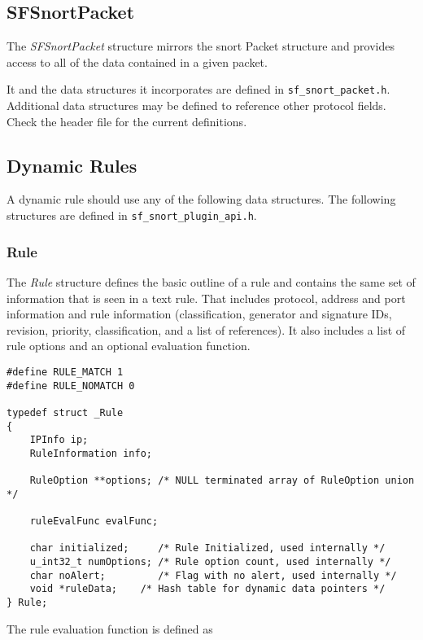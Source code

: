\documentclass[english]{report}
\begin{document}
\subsection{SFSnortPacket}

The {\em SFSnortPacket} structure mirrors the snort Packet structure and
provides access to all of the data contained in a given packet.

It and the data structures it incorporates are defined in
\texttt{sf\_snort\_packet.h}.  Additional data structures may be defined to
reference other protocol fields.  Check the header file for the current
definitions.

\subsection{Dynamic Rules}

A dynamic rule should use any of the following data structures.  The following
structures are defined in \texttt{sf\_snort\_plugin\_api.h}.

\subsubsection{Rule}

The {\em Rule} structure defines the basic outline of a rule and contains the
same set of information that is seen in a text rule.  That includes protocol,
address and port information and rule information (classification, generator
and signature IDs, revision, priority, classification, and a list of
references).  It also includes a list of rule options and an optional
evaluation function.

\begin{verbatim}
#define RULE_MATCH 1
#define RULE_NOMATCH 0

typedef struct _Rule
{
    IPInfo ip;
    RuleInformation info;

    RuleOption **options; /* NULL terminated array of RuleOption union */

    ruleEvalFunc evalFunc;

    char initialized;     /* Rule Initialized, used internally */
    u_int32_t numOptions; /* Rule option count, used internally */
    char noAlert;         /* Flag with no alert, used internally */
    void *ruleData;    /* Hash table for dynamic data pointers */
} Rule;
\end{verbatim}

The rule evaluation function is defined as
\end{document}
